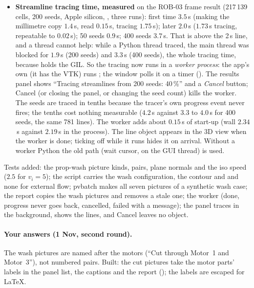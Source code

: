 \begin{itemize}[nosep]
  \item \textbf{Streamline tracing time, measured} on the ROB-03 frame result (217\,139 cells, 200 seeds, Apple silicon,
        , three runs): first time $3.5$\,s (making the millimetre copy $1.4$\,s, read $0.15$\,s, tracing $1.75$\,s);
        later $2.0$\,s ($1.73$\,s tracing, repeatable to $0.02$\,s); 50 seeds $0.9$\,s; 400 seeds $3.7$\,s. That is above the 2\,s
        line, and a thread cannot help: while a Python thread traced, the main thread was blocked for $1.9$\,s (200 seeds) and
        $3.3$\,s (400 seeds), the whole tracing time, because  holds the GIL. So the tracing now runs in
        a \emph{worker process}: the app's own  (it has the VTK) runs ; the window polls it on a
        timer (). The results panel shows ``Tracing streamlines from 200 seeds: 40\,\%'' and a \emph{Cancel}
        button; Cancel (or closing the panel, or changing the seed count) kills the worker. The seeds are traced in tenths because the
        tracer's own progress event never fires; the tenths cost nothing measurable ($4.2$\,s against $3.3$ to $4.0$\,s for 400
        seeds, the same 781 lines). The worker adds about $0.15$\,s of start-up (wall $2.34$\,s against $2.19$\,s in the process). The line
        object appears in the 3D view when the worker is done; ticking off while it runs hides it on arrival. Without a worker Python the old path
        (wait cursor, on the GUI thread) is used.
\end{itemize}
Tests added: the prop-wash picture kinds, pairs, plane normals and the iso speed ($2.5$ for $v_i=5$); the script carries the wash
configuration, the contour and  and none for external flow; pvbatch makes all seven pictures of a synthetic
wash case; the report copies the wash pictures and removes a stale one; the worker (done, progress never goes back, cancelled,
failed with a message); the panel traces in the background, shows the lines, and Cancel leaves no object.

\paragraph{Your answers (1 Nov, second round).} The wash pictures are named after the motors (``Cut through Motor~1 and
Motor~3''), not numbered pairs. Built: the cut pictures take the motor parts' labels in the panel list, the captions and the report (); the labels are escaped for LaTeX.
